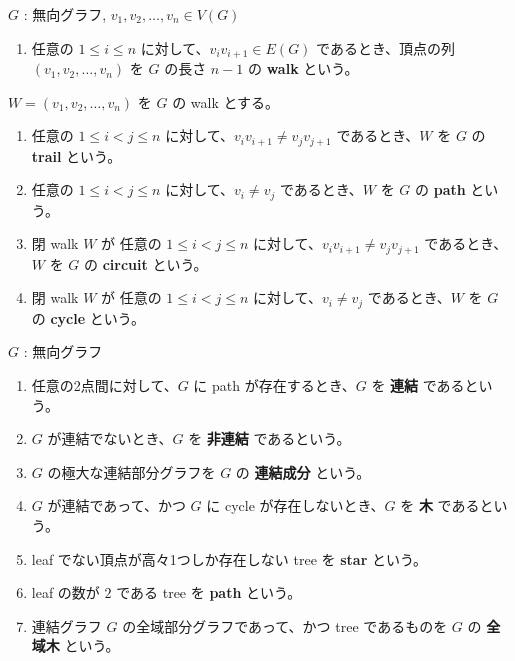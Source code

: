 \documentclass[article,paper=a4paper]{jlreq}
\begin{document}

\begin{dfn}
  \quad $G$ : 無向グラフ, \quad $v_1, v_2, \ldots, v_n \in V(G)$
  \begin{enumerate}[label=(\arabic*)\, ]
    \item 任意の $1 \leq i \leq n$ に対して、$v_iv_{i+1} \in E(G)$ であるとき、頂点の列 $\left(v_1, v_2, \ldots, v_n\right)$ を $G$ の長さ $n-1$ の \textbf{walk} という。
  \end{enumerate}
  $W = \left(v_1, v_2, \ldots, v_n\right)$ を $G$ の walk とする。
  \begin{enumerate}[label=(\arabic*)\, , resume]
    \item 任意の $1 \leq i < j \leq n$ に対して、$v_iv_{i+1} \neq v_jv_{j+1}$ であるとき、$W$ を $G$ の \textbf{trail} という。
    \item 任意の $1 \leq i < j \leq n$ に対して、$v_i \neq v_j$ であるとき、$W$ を $G$ の \textbf{path} という。
    \item 閉 walk $W$ が 任意の $1 \leq i < j \leq n$ に対して、$v_iv_{i+1} \neq v_jv_{j+1}$ であるとき、$W$ を $G$ の \textbf{circuit} という。
    \item 閉 walk $W$ が 任意の $1 \leq i < j \leq n$ に対して、$v_i \neq v_j$ であるとき、$W$ を $G$ の \textbf{cycle} という。
  \end{enumerate}
\end{dfn}

\begin{dfn}
  \quad $G$ : 無向グラフ\par
  \begin{enumerate}[label=(\arabic*)\, ]
    \item 任意の2点間に対して、$G$ に path が存在するとき、$G$ を \textbf{連結} であるという。
    \item $G$ が連結でないとき、$G$ を \textbf{非連結} であるという。
    \item $G$ の極大な連結部分グラフを $G$ の \textbf{連結成分} という。
    \item $G$ が連結であって、かつ $G$ に cycle が存在しないとき、$G$ を \textbf{木} であるという。
    \item leaf でない頂点が高々1つしか存在しない tree を \textbf{star} という。
    \item leaf の数が $2$ である tree を \textbf{path} という。
    \item 連結グラフ $G$ の全域部分グラフであって、かつ tree であるものを $G$ の \textbf{全域木} という。
  \end{enumerate}
\end{dfn}
\end{document}
